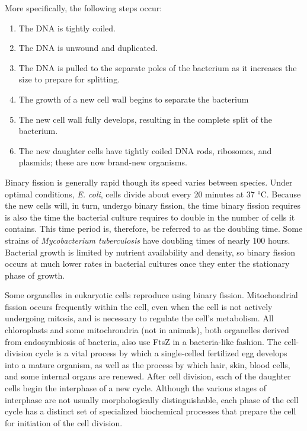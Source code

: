 More specifically, the following steps occur:

\begin{enumerate}
\def\labelenumi{\arabic{enumi}.}
\tightlist
\item
  The DNA is tightly coiled.
\item
  The DNA is unwound and duplicated.
\item
  The DNA is pulled to the separate poles of the bacterium as it increases the size to prepare for splitting.
\item
  The growth of a new cell wall begins to separate the bacterium
\item
  The new cell wall fully develops, resulting in the complete split of the bacterium.
\item
  The new daughter cells have tightly coiled DNA rods, ribosomes, and plasmids; these are now brand-new organisms.
\end{enumerate}

Binary fission is generally rapid though its speed varies between species. Under optimal conditions, \emph{E. coli}, cells divide about every 20 minutes at 37 °C. Because the new cells will, in turn, undergo binary fission, the time binary fission requires is also the time the bacterial culture requires to double in the number of cells it contains. This time period is, therefore, be referred to as the doubling time. Some strains of \emph{Mycobacterium tuberculosis} have doubling times of nearly 100 hours. Bacterial growth is limited by nutrient availability and density, so binary fission occurs at much lower rates in bacterial cultures once they enter the stationary phase of growth.

Some organelles in eukaryotic cells reproduce using binary fission. Mitochondrial fission occurs frequently within the cell, even when the cell is not actively undergoing mitosis, and is necessary to regulate the cell's metabolism. All chloroplasts and some mitochrondria (not in animals), both organelles derived from endosymbiosis of bacteria, also use FtsZ in a bacteria-like fashion.
The cell-division cycle is a vital process by which a single-celled fertilized egg develops into a mature organism, as well as the process by which hair, skin, blood cells, and some internal organs are renewed. After cell division, each of the daughter cells begin the interphase of a new cycle. Although the various stages of interphase are not usually morphologically distinguishable, each phase of the cell cycle has a distinct set of specialized biochemical processes that prepare the cell for initiation of the cell division.

